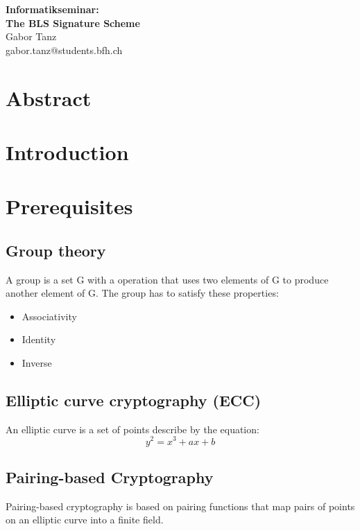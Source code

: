 \documentclass[a4paper,12pt]{scrartcl}
\begin{document}
\begin{titlepage}
\begin{center}
\vspace*{3cm}
\vspace{1cm}
\Huge \textbf{Informatikseminar: \\ The BLS Signature Scheme} \\
\vspace{6cm}
\vspace{1cm}
\large Gabor Tanz \\ gabor.tanz@students.bfh.ch \\
\end{center}
\end{titlepage}

\tableofcontents
\pagebreak

\section{Abstract}
\pagebreak

\section{Introduction}
\pagebreak

\section{Prerequisites}
\subsection{Group theory}
A group is a set G with a operation that uses two elements of G to produce another element of G. The group has to satisfy these properties:
\begin{itemize}
	\item Associativity
	\item Identity
	\item Inverse
\end{itemize}

\subsection{Elliptic curve cryptography (ECC)}
An elliptic curve is a set of points describe by the equation:
\begin{equation*}
y^2 = x^3 + ax + b
\end{equation*}

\subsection{Pairing-based Cryptography}
Pairing-based cryptography is based on pairing functions that map pairs of points on an elliptic curve into a finite field.
\end{document}
